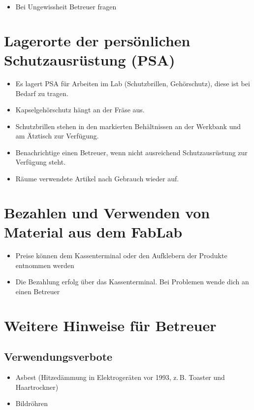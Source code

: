 \documentclass[13pt]{\basedir/fablab-document}
\begin{document}
\begin{itemize}
	\item Bei Ungewissheit Betreuer fragen
\end{itemize}



\section{Lagerorte der persönlichen Schutzausrüstung (PSA)}
\begin{itemize}
	\item Es lagert PSA für Arbeiten im Lab (Schutzbrillen, Gehörschutz), diese ist bei Bedarf zu tragen.
	\item Kapselgehörschutz hängt an der Fräse aus.
	\item Schutzbrillen stehen in den markierten Behältnissen an der Werkbank und am Ätztisch zur Verfügung.
	\item Benachrichtige einen Betreuer, wenn nicht ausreichend Schutzausrüstung zur Verfügung steht.
	\item Räume verwendete Artikel nach Gebrauch wieder auf.
	
\end{itemize}



\section{Bezahlen und Verwenden von Material aus dem FabLab}
\begin{itemize}
	\item Preise können dem Kassenterminal oder den Aufklebern der Produkte entnommen werden
	\item Die Bezahlung erfolg über das Kassenterminal. Bei Problemen wende dich an einen Betreuer
	
\end{itemize}


\newpage
\section{Weitere Hinweise für Betreuer}
\subsection{Verwendungsverbote}
\begin{itemize}
	\item Asbest (Hitzedämmung in Elektrogeräten vor 1993, z.\,B. Toaster und Haartrockner)
	\item Bildröhren
\end{itemize}
\end{document}
